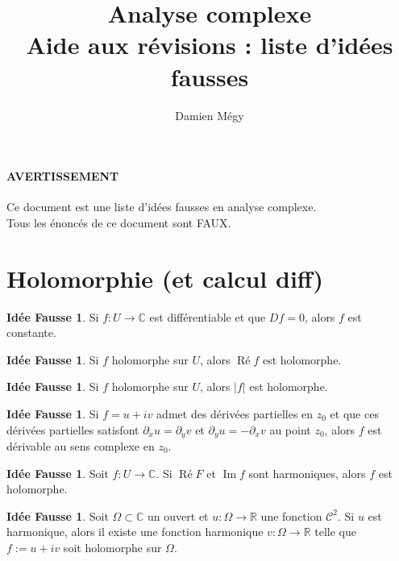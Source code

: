 \documentclass[11pt,a4paper]{article}
\title{Analyse complexe\\ Aide aux révisions : liste d'idées fausses}
\author{Damien Mégy}
\newcommand{\R}{\mathbb{R}}
\newcommand{\C}{\mathbb{C}}
\DeclareMathOperator{\PR}{\text{Ré}}
\DeclareMathOperator{\PI}{\text{Im}}
\theoremstyle{definition}
\newtheorem{ideeFausse}[theoreme]{Idée Fausse}
\theoremstyle{plain}
\begin{document}
\maketitle
\tableofcontents

\bigskip
\paragraph{AVERTISSEMENT}
Ce document est une liste d'idées fausses en analyse complexe.\\

Tous les énoncés de ce document sont {\Large FAUX}.

\section{Holomorphie (et calcul diff)}

\begin{ideeFausse}
Si $f : U\to \C$ est différentiable et que $Df=0$, alors $f$ est constante.
\end{ideeFausse}

\begin{ideeFausse}
Si $f$ holomorphe sur $U$, alors $\PR f$ est holomorphe.
\end{ideeFausse}

\begin{ideeFausse}
Si $f$ holomorphe sur $U$, alors $|f|$ est holomorphe.
\end{ideeFausse}

\begin{ideeFausse}
Si $f=u+iv$ admet des dérivées partielles en $z_0$ et que ces dérivées partielles satisfont $\partial_x u = \partial_y v$ et $\partial_y u = -\partial_x v$ au point $z_0$, alors $f$ est dérivable au sens complexe en $z_0$.
\end{ideeFausse}

\begin{ideeFausse}
Soit $f : U\to \C$. Si $\PR F$ et $\PI f$ sont harmoniques, alors $f$ est holomorphe.
\end{ideeFausse}

\begin{ideeFausse}
Soit $\Omega\subset \C$ un ouvert et $u : \Omega\to \R$ une fonction $\mathcal C^2$.
Si $u$ est harmonique, alors il existe une fonction harmonique $v : \Omega\to \R$ telle que $f:=u+iv$ soit holomorphe sur $\Omega$.
\end{ideeFausse}
%
%
%
%
\end{document}
